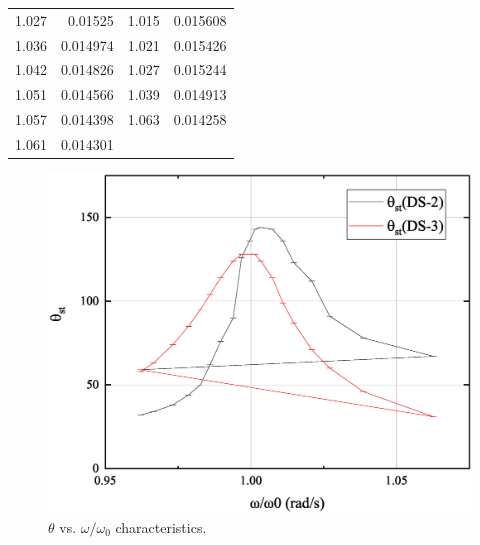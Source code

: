 \documentclass[a4paper]{report}
\begin{document}
\begin{table}[htbp]
\begin{tabular}{|c|rrr}
			\cmidrule{1-1}\cmidrule{3-3}    1.027  & \multicolumn{1}{r|}{0.01525} & \multicolumn{1}{c|}{1.015} & 0.015608 \\
			\cmidrule{1-1}\cmidrule{3-3}    1.036  & \multicolumn{1}{r|}{0.014974} & \multicolumn{1}{c|}{1.021} & 0.015426 \\
			\cmidrule{1-1}\cmidrule{3-3}    1.042  & \multicolumn{1}{r|}{0.014826} & \multicolumn{1}{c|}{1.027} & 0.015244 \\
			\cmidrule{1-1}\cmidrule{3-3}    1.051  & \multicolumn{1}{r|}{0.014566} & \multicolumn{1}{c|}{1.039} & 0.014913 \\
			\cmidrule{1-1}\cmidrule{3-3}    1.057  & \multicolumn{1}{r|}{0.014398} & \multicolumn{1}{c|}{1.063} & 0.014258 \\
			\cmidrule{1-1}\cmidrule{3-3}    1.061  & 0.014301 &       &  \\
			\cmidrule{1-1}    \end{tabular}
		\label{tab:addlabel}
	\end{table}
	\begin{figure}[H]
		\centering
		\includegraphics[width=1\linewidth]{4.eps}
		\caption{$\theta$ vs. $\omega/\omega_0$ characteristics.}
	\end{figure}
\end{document}
